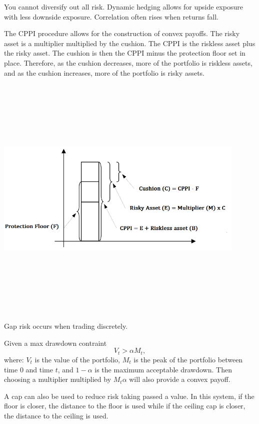 \documentclass{article}
\begin{document}
You cannot diversify out all risk. Dynamic
hedging allows for upside exposure with 
less downside exposure. Correlation often rises when
returns fall. 

The CPPI procedure allows for the construction 
of convex payoffs. The risky asset is a multiplier multiplied by
the cushion. The CPPI is the riskless asset plus the
risky asset. The cushion is then the CPPI minus the protection
floor set in place. Therefore, as the cushion decreases, more
of the portfolio is riskless assets, and as the cushion increases,
more of the portfolio is risky assets. 

\begin{center}
    \includegraphics[width=12cm,height=12cm, keepaspectratio]{Images/CPPI.png}
\end{center}

\noindent Gap risk occurs when trading discretely.

Given a max drawdown contraint 
\[V_t > \alpha M_t,\] where: $V_t$ is the value of the portfolio,
$M_t$ is the peak of the portfolio between time $0$ and time $t$,
and $1-\alpha$ is the maximum acceptable drawdown. Then choosing
a multiplier multiplied by $M_t \alpha$ will also provide a convex
payoff. 

A cap can also be used to reduce risk taking passed a value. 
In this system, if the floor is closer, the distance to the floor
is used while if the ceiling cap is closer, the distance to the
ceiling is used. 
\end{document}
